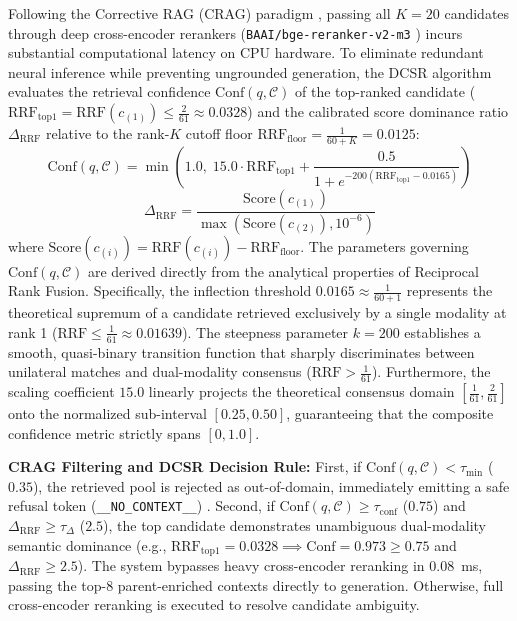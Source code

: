 \documentclass[10pt]{SPIIRAS_Proceedings}
\begin{document}
Following the Corrective RAG (CRAG) paradigm \cite{yan2024corrective}, passing all $K=20$ candidates through deep cross-encoder rerankers (\texttt{BAAI/bge-reranker-v2-m3} \cite{chen2024bge,xiao2023cpack}) incurs substantial computational latency on CPU hardware. To eliminate redundant neural inference while preventing ungrounded generation, the DCSR algorithm evaluates the retrieval confidence $\text{Conf}(q, \mathcal{C})$ of the top-ranked candidate ($\text{RRF}_{\text{top1}} = \text{RRF}(c_{(1)}) \le \frac{2}{61} \approx 0.0328$) and the calibrated score dominance ratio $\Delta_{\text{RRF}}$ relative to the rank-$K$ cutoff floor $\text{RRF}_{\text{floor}} = \frac{1}{60 + K} = 0.0125$:
\begin{equation}
\text{Conf}(q, \mathcal{C}) = \min\left(1.0, \; 15.0 \cdot \text{RRF}_{\text{top1}} + \frac{0.5}{1 + e^{-200(\text{RRF}_{\text{top1}} - 0.0165)}}\right)
\label{eq:conf}
\end{equation}
\begin{equation}
\Delta_{\text{RRF}} = \frac{\text{Score}(c_{(1)})}{\max(\text{Score}(c_{(2)}), 10^{-6})}
\label{eq:deltarrf}
\end{equation}
where $\text{Score}(c_{(i)}) = \text{RRF}(c_{(i)}) - \text{RRF}_{\text{floor}}$.
The parameters governing $\text{Conf}(q, \mathcal{C})$ are derived directly from the analytical properties of Reciprocal Rank Fusion. Specifically, the inflection threshold $0.0165 \approx \frac{1}{60+1}$ represents the theoretical supremum of a candidate retrieved exclusively by a single modality at rank 1 ($\text{RRF} \le \frac{1}{61} \approx 0.01639$). The steepness parameter $k = 200$ establishes a smooth, quasi-binary transition function that sharply discriminates between unilateral matches and dual-modality consensus ($\text{RRF} > \frac{1}{61}$). Furthermore, the scaling coefficient $15.0$ linearly projects the theoretical consensus domain $[\frac{1}{61}, \frac{2}{61}]$ onto the normalized sub-interval $[0.25, 0.50]$, guaranteeing that the composite confidence metric strictly spans $[0, 1.0]$.

\textbf{CRAG Filtering and DCSR Decision Rule:} First, if $\text{Conf}(q, \mathcal{C}) < \tau_{\min}$ ($0.35$), the retrieved pool is rejected as out-of-domain, immediately emitting a safe refusal token (\texttt{\_\_NO\_CONTEXT\_\_}) \cite{yan2024corrective}. Second, if $\text{Conf}(q, \mathcal{C}) \ge \tau_{\text{conf}}$ ($0.75$) and $\Delta_{\text{RRF}} \ge \tau_{\Delta}$ ($2.5$), the top candidate demonstrates unambiguous dual-modality semantic dominance (e.g., $\text{RRF}_{\text{top1}} = 0.0328 \implies \text{Conf} = 0.973 \ge 0.75$ and $\Delta_{\text{RRF}} \ge 2.5$). The system bypasses heavy cross-encoder reranking \cite{chen2024bge} in $0.08$~ms, passing the top-8 parent-enriched contexts directly to generation. Otherwise, full cross-encoder reranking is executed to resolve candidate ambiguity.
\end{document}
